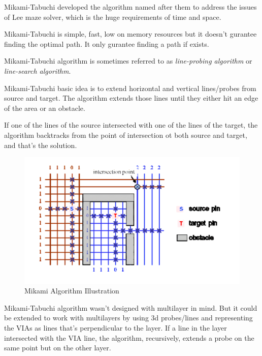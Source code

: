 Mikami-Tabuchi developed the algorithm named after them \cite{mikami1968computer} to address the issues of Lee maze solver, which is the huge requirements of time and space.

Mikami-Tabuchi is simple, fast, low on memory resources but it doesn't gurantee finding the optimal path. It only gurantee finding a path if exists.

Mikami-Tabuchi algorithm is sometimes referred to as \textit{line-probing algorithm} or \textit{line-search algorithm}.

Mikami-Tabuchi basic idea is to extend horizontal and vertical lines/probes from source and target. The algorithm extends those lines until they either hit an edge of the area or an obstacle.

If one of the lines of the source intersected with one of the lines of the target, the algorithm backtracks from the point of intersection ot both source and target, and that's the solution.

\begin{figure}
    \centering
    \includegraphics[width=\linewidth]{figures/mikami.png}
    \caption{Mikami Algorithm Illustration \cite{chen2009global}}
    \label{fig:mikamiIllustr}
\end{figure}

Mikami-Tabuchi algorithm wasn't designed with multilayer in mind. But it could be extended to work with multilayers by using 3d probes/lines and representing the VIAs as lines that's perpendicular to the layer. If a line in the layer intersected with the VIA line, the algorithm, recursively, extends a probe on the same point but on the other layer.

